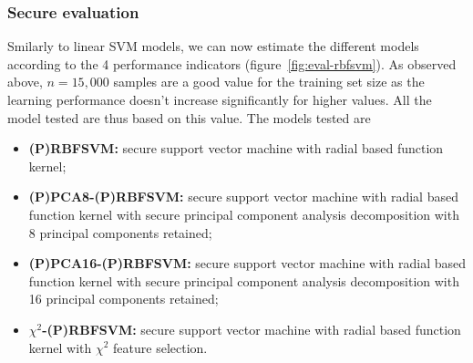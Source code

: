 \subsubsection{Secure evaluation}
Smilarly to linear SVM models, we can now estimate the different models according to the 4 performance indicators (figure~\ref{fig:eval-rbfsvm}). As observed above, $n=15,000$ samples are a good value for the training set size as the learning performance doesn't increase significantly for higher values. All the model tested are thus based on this value. The models tested are
\begin{itemize}
    \item \textbf{(P)RBFSVM:} secure support vector machine with radial based function kernel;
    \item \textbf{(P)PCA8-(P)RBFSVM:} secure support vector machine with radial based function kernel with secure principal component analysis decomposition with 8 principal components retained;
    \item \textbf{(P)PCA16-(P)RBFSVM:} secure support vector machine with radial based function kernel with secure principal component analysis decomposition with 16 principal components retained;
    \item \textbf{$\chi^2$-(P)RBFSVM:} secure support vector machine with radial based function kernel with $\chi^2$ feature selection.
\end{itemize}

